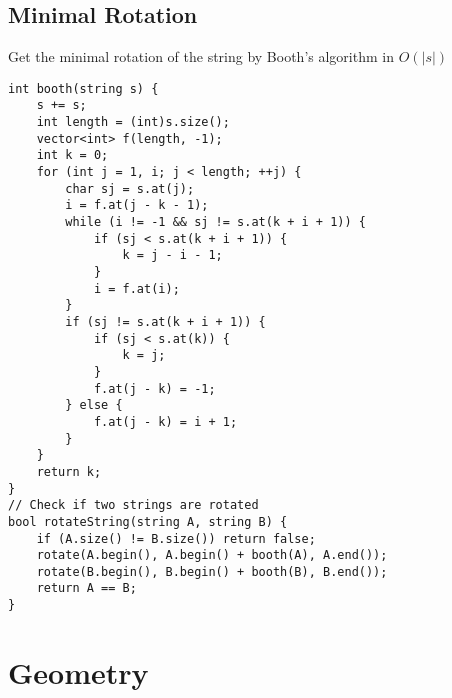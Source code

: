 \documentclass[10pt]{article}{\twocolumn}
\begin{document}
\subsection{Minimal Rotation}
Get the minimal rotation of the string by Booth's algorithm in $O(|s|)$
\begin{lstlisting}
int booth(string s) {
    s += s;
    int length = (int)s.size();
    vector<int> f(length, -1);
    int k = 0;
    for (int j = 1, i; j < length; ++j) {
        char sj = s.at(j);
        i = f.at(j - k - 1);
        while (i != -1 && sj != s.at(k + i + 1)) {
            if (sj < s.at(k + i + 1)) {
                k = j - i - 1;
            }
            i = f.at(i);
        }
        if (sj != s.at(k + i + 1)) {
            if (sj < s.at(k)) {
                k = j;
            }
            f.at(j - k) = -1;
        } else {
            f.at(j - k) = i + 1;
        }
    }
    return k;
}
// Check if two strings are rotated
bool rotateString(string A, string B) {
    if (A.size() != B.size()) return false;
    rotate(A.begin(), A.begin() + booth(A), A.end());
    rotate(B.begin(), B.begin() + booth(B), B.end());
    return A == B;
}
\end{lstlisting}


\section{Geometry}
\end{document}
